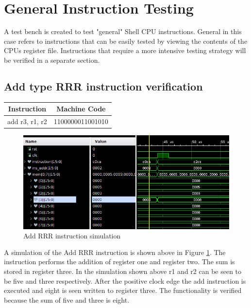 \documentclass{article}
\begin{document}
\newpage

\section{ General Instruction Testing }
\label{CTRL_TEST}

	 A test bench is created to test "general" Shell CPU instructions. General in this case refers to instructions that can be easily tested by viewing the contents of the CPUs register file. Instructions that require a more intensive testing strategy will be verified in a separate section.  
	
	\subsection{Add type RRR instruction verification}
		\vspace{.5cm}
		\begin{center}
			\begin{tabular}{|c|c|}
				\hline 
				\textbf{Instruction} & \textbf{Machine Code} \\ 
				\hline 
				add r3, r1, r2 & 1100000011001010 \\ 
				\hline 
			\end{tabular} 
		\end{center}
		
		\begin{figure}[H]
			\centering
			\includegraphics[width=5in]{img/addRRRTest.png}
			\caption{Add RRR instruction simulation}
			\label{fig:addrrrtest}
		\end{figure}
	
		\begin{par}
			A simulation of the Add RRR instruction is shown above in Figure \ref{fig:addrrrtest}. The instruction performs the addition of register one and register two. The sum is stored in register three. In the simulation shown above r1 and r2 can be seen to be five and three respectively. After the positive clock edge the add instruction is executed and eight is seen written to register three. The functionality is verified because the sum of five and three is eight. 
		\end{par}
		\newpage
	
\end{document}
